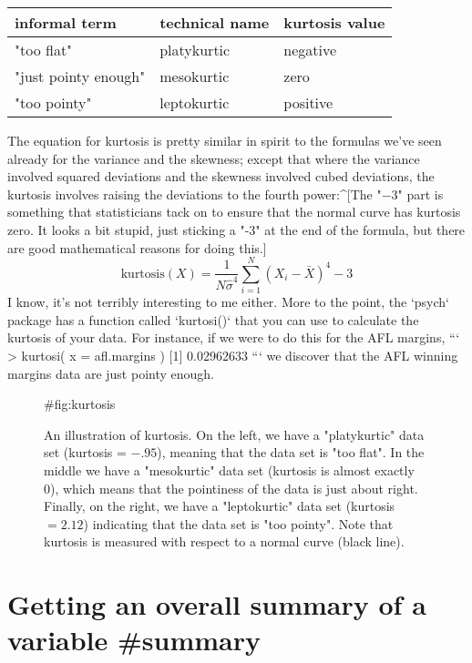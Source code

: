 \begin{center}
\begin{tabular}{lll}
informal term & technical name & kurtosis value \\ \hline
"too flat" & platykurtic & negative \\
"just pointy enough" & mesokurtic & zero \\
"too pointy" & leptokurtic & positive 
\end{tabular}
\end{center}

The equation for kurtosis is pretty similar in spirit to the formulas we've seen already for the variance and the skewness; except that where the variance involved squared deviations and the skewness involved cubed deviations, the kurtosis involves raising the deviations to the fourth power:^[The "$-3$" part is something that statisticians tack on to ensure that the normal curve has kurtosis zero. It looks a bit stupid, just sticking a "-3" at the end of the formula, but there are good mathematical reasons for doing this.]
$$
\mbox{kurtosis}(X) = \frac{1}{N \hat\sigma^4} \sum_{i=1}^N \left( X_i - \bar{X} \right)^4  - 3
$$
I know, it's not terribly interesting to me either. More to the point, the `psych` package has a function called `kurtosi()` that you can use to calculate the kurtosis of your data. For instance, if we were to do this for the AFL margins, 
```
> kurtosi( x = afl.margins )
[1] 0.02962633
```
we discover that the AFL winning margins data are just pointy enough.



\begin{figure}[t]
\begin{center}
\caption{An illustration of kurtosis. On the left, we have a "platykurtic" data set (kurtosis = $-.95$), meaning that the data set is "too flat". In the middle we have a "mesokurtic" data set (kurtosis is almost exactly 0), which means that the pointiness of the data is just about right. Finally, on the right, we have a "leptokurtic" data set (kurtosis $= 2.12$) indicating that the data set is "too pointy". Note that kurtosis is measured with respect to a normal curve (black line).}
{#fig:kurtosis}
\HR
\end{center}
\end{figure}

\section{Getting an overall summary of a variable {#summary}}

